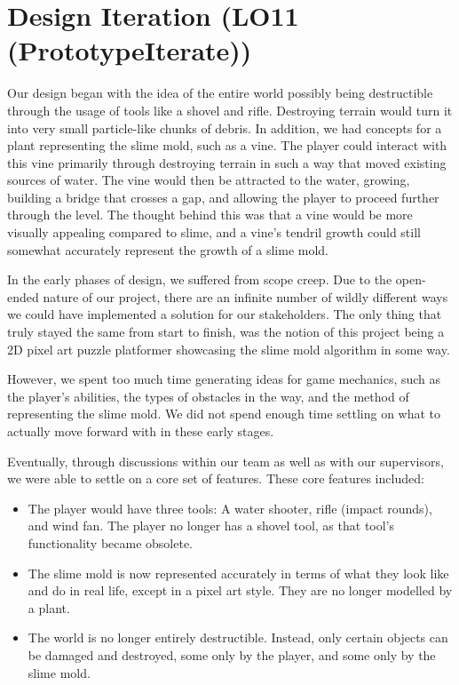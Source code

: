 \documentclass{article}
\begin{document}
\section{Design Iteration (LO11 (PrototypeIterate))}

Our design began with the idea of the entire world possibly being destructible through 
the usage of tools like a shovel and rifle. Destroying terrain would turn it into very small
particle-like chunks of debris. In addition, we had concepts for a plant representing the 
slime mold, such as a vine. The player could interact with this vine primarily through 
destroying terrain in such a way that moved existing sources of water. The vine 
would then be attracted to the water, growing, building a bridge that crosses a gap, 
and allowing the player  to proceed further through the level. The thought behind this 
was that a vine would be more visually appealing compared to slime, and a vine's 
tendril growth could still somewhat accurately represent the growth of a slime mold.

In the early phases of design, we suffered from scope creep. Due to the open-ended nature 
of our project, there are an infinite number of wildly different ways we could have 
implemented a solution for our stakeholders. The only thing that truly stayed the same 
from start to finish, was the notion of this project being a 2D pixel art puzzle platformer
showcasing the slime mold algorithm in some way.

However, we spent too much time generating ideas for game mechanics, such as the player's
abilities, the types of obstacles in the way, and the method of representing the slime mold.
We did not spend enough time settling on what to actually move forward with in these early 
stages. 

Eventually, through discussions within our team as well as with our supervisors, 
we were able to settle on a core set of features. These core features included:
\begin{itemize}
    \item The player would have three tools: A water shooter, rifle (impact rounds), and wind fan.
    The player no longer has a shovel tool, as that tool's functionality became obsolete.
    \item The slime mold is now represented accurately in terms of what they look like and 
    do in real life, except in a pixel art style. They are no longer modelled by a plant.
    \item The world is no longer entirely destructible. Instead, only certain objects 
    can be damaged and destroyed, some only by the player, and some only by the slime mold.
\end{itemize}
\end{document}
